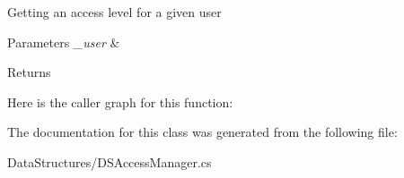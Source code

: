 Getting an access level for a given user 


\begin{DoxyParams}{Parameters}
{\em \+\_\+user} & \\
\hline
\end{DoxyParams}
\begin{DoxyReturn}{Returns}

\end{DoxyReturn}


Here is the caller graph for this function\+:




The documentation for this class was generated from the following file\+:\begin{DoxyCompactItemize}
\item 
Data\+Structures/D\+S\+Access\+Manager.\+cs\end{DoxyCompactItemize}
